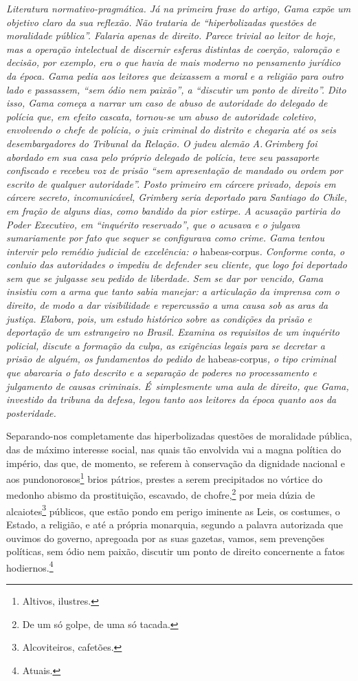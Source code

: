 \begin{resumo}
\emph{Literatura normativo-pragmática. Já na primeira frase do artigo,
Gama expõe um objetivo claro da sua reflexão. Não trataria de
``hiperbolizadas questões de moralidade pública''. Falaria apenas de
direito. Parece trivial ao leitor de hoje, mas a operação intelectual de
discernir esferas distintas de coerção, valoração e decisão, por
exemplo, era o que havia de mais moderno no pensamento jurídico da
época. Gama pedia aos leitores que deixassem a moral e a religião para
outro lado e passassem, ``sem ódio nem paixão'', a ``discutir um ponto de
direito''. Dito isso, Gama começa a narrar um caso de abuso de autoridade
do delegado de polícia que, em efeito cascata, tornou-se um abuso de
autoridade coletivo, envolvendo o chefe de polícia, o juiz criminal do
distrito e chegaria até os seis desembargadores do Tribunal da Relação.
O judeu alemão A.\,Grimberg foi abordado em sua casa pelo próprio
delegado de polícia, teve seu passaporte confiscado e recebeu voz de
prisão ``sem apresentação de mandado ou ordem por escrito de qualquer
autoridade''. Posto primeiro em cárcere privado, depois em cárcere
secreto, incomunicável, Grimberg seria deportado para Santiago do Chile,
em fração de alguns dias, como bandido da pior estirpe. A acusação
partiria do Poder Executivo, em ``inquérito reservado'', que o acusava e o
julgava sumariamente por fato que sequer se configurava como crime.
Gama tentou intervir pelo remédio judicial de excelência: o}
habeas-corpus\emph{. Conforme conta, o conluio das autoridades o impediu
de defender seu cliente, que logo foi deportado sem que se julgasse seu
pedido de liberdade. Sem se dar por vencido, Gama insistiu com a arma
que tanto sabia manejar: a articulação da imprensa com o direito, de
modo a dar visibilidade e repercussão a uma causa sob as aras da
justiça. Elabora, pois, um estudo histórico sobre as condições da prisão
e deportação de um estrangeiro no Brasil. Examina os requisitos de um
inquérito policial, discute a formação da culpa, as exigências legais
para se decretar a prisão de alguém, os fundamentos do pedido de}
habeas-corpus\emph{, o tipo criminal que abarcaria o fato descrito e a
separação de poderes no processamento e julgamento de causas criminais.
É~simplesmente uma aula de direito, que Gama, investido da tribuna da
defesa, legou tanto aos leitores da época quanto aos da posteridade.}
\end{resumo}

Separando-nos completamente das hiperbolizadas questões de moralidade
pública, das de máximo interesse social, nas quais tão envolvida vai a
magna política do império, das que, de momento, se referem à conservação
da dignidade nacional e aos pundonorosos\footnote{Altivos, ilustres.}
brios pátrios, prestes a serem precipitados no vórtice do medonho abismo
da prostituição, escavado, de chofre,\footnote{De um só golpe, de uma
  só tacada.} por meia dúzia de alcaiotes\footnote{Alcoviteiros,
  cafetões.} públicos, que estão pondo em perigo iminente as Leis, os
costumes, o Estado, a religião, e até a própria monarquia, segundo a
palavra autorizada que ouvimos do governo, apregoada por as suas
gazetas, vamos, sem prevenções políticas, sem ódio nem paixão, discutir
um ponto de direito concernente a fatos hodiernos.\footnote{Atuais.}

